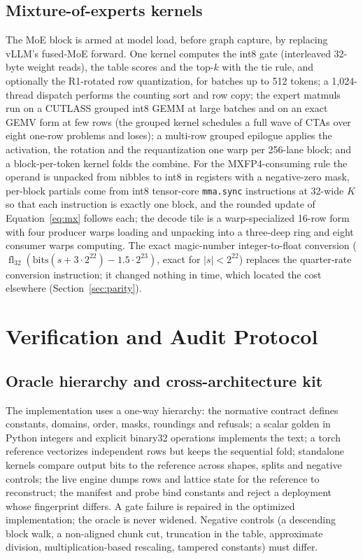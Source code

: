 \documentclass{article}
\newcommand{\fl}{\operatorname{fl}_{32}}
\begin{document}
\subsection{Mixture-of-experts kernels}

The MoE block is armed at model load, before graph capture, by replacing vLLM's fused-MoE
forward.  One kernel computes the int8 gate (interleaved 32-byte weight reads), the table
scores and the top-$k$ with the tie rule, and optionally the R1-rotated row quantization, for
batches up to 512 tokens; a 1,024-thread dispatch performs the counting sort and row copy; the
expert matmuls run on a CUTLASS grouped int8 GEMM at large batches and on an exact GEMV form
at few rows (the grouped kernel schedules a full wave of CTAs over eight one-row problems and
loses); a multi-row grouped epilogue applies the activation, the rotation and the requantization
one warp per 256-lane block; and a block-per-token kernel folds the combine.  For the
MXFP4-consuming rule the operand is unpacked from nibbles to int8 in registers with a
negative-zero mask, per-block partials come from int8 tensor-core \texttt{mma.sync}
instructions at 32-wide $K$ so that each instruction is exactly one block, and the rounded
update of Equation~\eqref{eq:mx} follows each; the decode tile is a warp-specialized 16-row
form with four producer warps loading and unpacking into a three-deep ring and eight consumer
warps computing.  The exact magic-number integer-to-float conversion
($\fl(\mathrm{bits}(s+3\cdot2^{22})-1.5\cdot2^{23})$, exact for $|s|<2^{22}$) replaces the
quarter-rate conversion instruction; it changed nothing in time, which located the cost
elsewhere (Section~\ref{sec:parity}).

\section{Verification and Audit Protocol}
\label{sec:audit}

\subsection{Oracle hierarchy and cross-architecture kit}

The implementation uses a one-way hierarchy: the normative contract defines constants,
domains, order, masks, roundings and refusals; a scalar golden in Python integers and
explicit binary32 operations implements the text; a torch reference vectorizes independent
rows but keeps the sequential fold; standalone kernels compare output bits to the reference
across shapes, splits and negative controls; the live engine dumps rows and lattice state
for the reference to reconstruct; the manifest and probe bind constants and reject a
deployment whose fingerprint differs.  A gate failure is repaired in the optimized
implementation; the oracle is never widened.  Negative controls (a descending block walk, a
non-aligned chunk cut, truncation in the table, approximate division, multiplication-based
rescaling, tampered constants) must differ.
\end{document}
